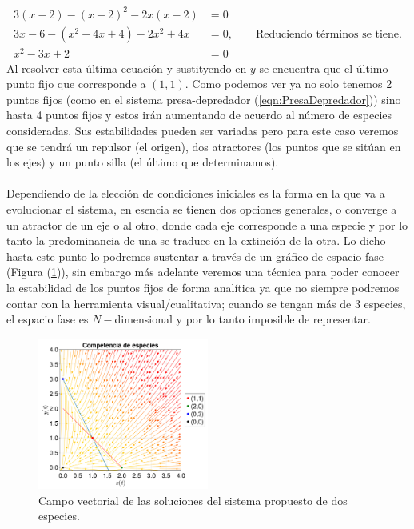 \begin{ejemplo}
\begin{align*}
		\\
		3(x-2)-(x-2)^2-2x(x-2) &= 0\\
		3x-6-(x^2-4x+4)-2x^2+4x&=0,\qquad\text{Reduciendo términos se tiene.}\\
		x^2-3x+2 &= 0
	\end{align*}
	Al resolver esta última ecuación y sustityendo en $y$ se encuentra que el último punto fijo que corresponde a $(1,1)$. Como podemos ver ya no solo tenemos 2 puntos fijos (como en el sistema presa-depredador (\ref{eqn:PresaDepredador})) sino hasta 4 puntos fijos y estos irán aumentando de acuerdo al número de especies consideradas. Sus estabilidades pueden ser variadas pero para este caso  veremos que se tendrá un repulsor (el origen), dos atractores (los puntos que se sitúan en los ejes) y un punto silla (el último que determinamos). 
	\\
	\\
	Dependiendo de la elección de condiciones iniciales es la forma en la que va a evolucionar el sistema, en esencia se tienen dos opciones generales, o converge a un atractor de un eje o al otro, donde cada eje corresponde a una especie y por lo tanto la predominancia de una se traduce en la extinción de la otra. Lo dicho hasta este punto lo podremos sustentar a través de un gráfico de espacio fase (Figura (\ref{fig:CompetenciaEspecies})), sin embargo más adelante veremos una técnica para poder conocer la estabilidad de los puntos fijos de forma analítica ya que no siempre podremos contar con la herramienta visual/cualitativa; cuando se tengan más de 3 especies, el espacio fase es $N-$dimensional y por lo tanto imposible de representar.
	\newpage
	
\end{ejemplo}
\begin{figure} \vspace{-30pt} \begin{center}
		\includegraphics[width=0.5\textwidth]{../Imagenes/Competencia de especies} 
	\end{center} 
	\vspace{-20pt} 
	\caption{Campo vectorial de las soluciones del sistema propuesto de dos especies.} 
	\vspace{-10pt}
	\label{fig:CompetenciaEspecies}
\end{figure} 
